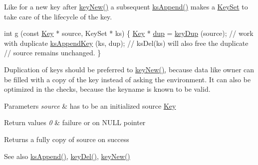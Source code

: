 Like for a new key after \hyperlink{group__key_gad23c65b44bf48d773759e1f9a4d43b89}{key\+New()} a subsequent \hyperlink{group__keyset_ga21eb9c3a14a604ee3a8bdc779232e7b7}{ks\+Append()} makes a \hyperlink{classkdb_1_1KeySet}{Key\+Set} to take care of the lifecycle of the key.


\begin{DoxyCode}
\textcolor{keywordtype}{int} g (\textcolor{keyword}{const} \hyperlink{classkdb_1_1Key_a5679f5cae63caddd64a60388b9cc77fa}{Key} * source, KeySet * ks)
\{
        \hyperlink{classkdb_1_1Key_a5679f5cae63caddd64a60388b9cc77fa}{Key} * \hyperlink{classkdb_1_1Key_ababb1ccd9f18db379eb4a62f8db87bf5}{dup} = \hyperlink{group__key_gae6ec6a60cc4b8c1463fa08623d056ce3}{keyDup} (source);
        \textcolor{comment}{// work with duplicate}
        \hyperlink{group__keyset_gaa5a1d467a4d71041edce68ea7748ce45}{ksAppendKey} (ks, dup);
        \textcolor{comment}{// ksDel(ks) will also free the duplicate}
        \textcolor{comment}{// source remains unchanged.}
\}
\end{DoxyCode}


Duplication of keys should be preferred to \hyperlink{group__key_gad23c65b44bf48d773759e1f9a4d43b89}{key\+New()}, because data like owner can be filled with a copy of the key instead of asking the environment. It can also be optimized in the checks, because the keyname is known to be valid.


\begin{DoxyParams}{Parameters}
{\em source} & has to be an initialized source \hyperlink{classkdb_1_1Key}{Key} \\
\hline
\end{DoxyParams}

\begin{DoxyRetVals}{Return values}
{\em 0} & failure or on N\+U\+LL pointer \\
\hline
\end{DoxyRetVals}
\begin{DoxyReturn}{Returns}
a fully copy of source on success 
\end{DoxyReturn}
\begin{DoxySeeAlso}{See also}
\hyperlink{group__keyset_ga21eb9c3a14a604ee3a8bdc779232e7b7}{ks\+Append()}, \hyperlink{group__key_ga3df95bbc2494e3e6703ece5639be5bb1}{key\+Del()}, \hyperlink{group__key_gad23c65b44bf48d773759e1f9a4d43b89}{key\+New()} 
\end{DoxySeeAlso}
\mbox{\label{classkdb_1_1Key_ac558a1f1b2cb50d77fbabcbb24950c05}} 
